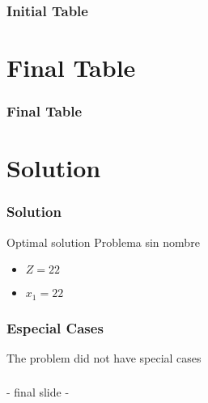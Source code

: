 \documentclass{beamer}
\begin{document}
\begin{frame}  
\frametitle{Initial Table} 
\begin{table}[H] 
\begin{center} 
\caption{Initial Table.} 
\end{center} 
\end{table} 
\end{frame} 
 
\section{Final Table} 
 
\begin{frame}  
\frametitle{Final Table} 
\begin{table}[H] 
\begin{center} 
\caption{Final Table.} 
\end{center} 
\end{table} 
\end{frame} 
 

\section{Solution} 
\begin{frame} 
\frametitle{Solution} 
\begin{exampleblock}{Optimal solution} 
{\scriptsize Problema sin nombre} 
\begin{itemize} 
\item $Z = 22$ 
\item $x_{1} = 22$ 
\end{itemize} 
\end{exampleblock} 
\end{frame} 


\begin{frame} 
\frametitle{Especial Cases} 
The problem did not have special cases 
\end{frame} 

\begin{frame}\frametitle{}\begin{center}{\Huge - final slide -}\end{center}\end{frame} 
\end{document}
